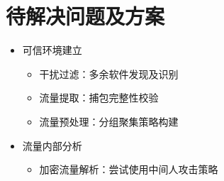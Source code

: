 \section{待解决问题及方案}
\begin{frame}
    \begin{itemize}[<+->]
        \item 可信环境建立
            \begin{itemize}[<+->]
                \item 干扰过滤：多余软件发现及识别
                \item 流量提取：捕包完整性校验
                \item \alert{流量预处理}：分组聚集策略构建
            \end{itemize}
        \item 流量内部分析
            \begin{itemize}
                \item \alert{加密流量解析}：尝试使用中间人攻击策略
            \end{itemize}
    \end{itemize}
    \nocite{*}
\end{frame}
